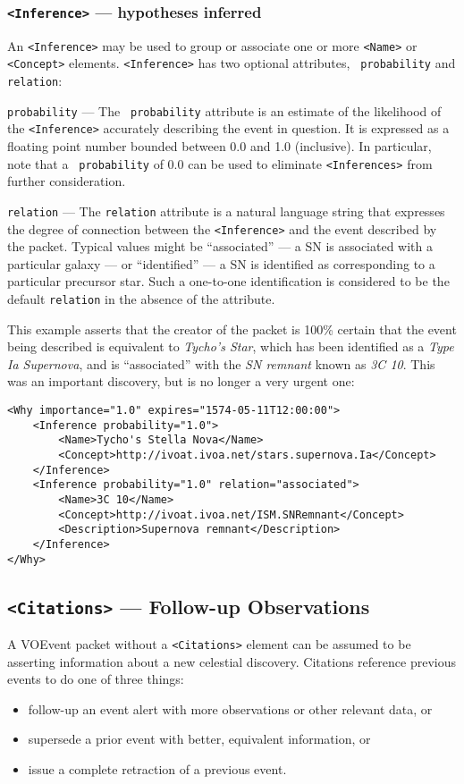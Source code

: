 \documentclass[11pt,a4paper]{ivoa}
\begin{document}
\subsubsection{{\tt <Inference>} --- hypotheses inferred}\label{sec:3.6.6}
An {\tt <Inference>} may be used to group or associate one or more {\tt <Name>}
or {\tt <Concept>} elements. {\tt <Inference>} has two optional attributes, {\tt
probability} and {\tt relation}:

 {\tt probability}\label{sec:3.6.6.1} --- The {\tt
probability} attribute is an estimate of the likelihood of the {\tt <Inference>}
accurately describing the event in question. It is expressed as a floating point
number bounded between 0.0 and 1.0 (inclusive). In particular, note that a {\tt
probability} of 0.0 can be used to eliminate {\tt <Inferences>} from further
consideration.

 {\tt relation}\label{sec:3.6.6.2} --- The {\tt relation}
attribute is a natural language string that expresses the degree of connection
between the {\tt <Inference>} and the event described by the packet. Typical
values might be ``associated'' --- a SN is associated with a particular galaxy
--- or ``identified'' --- a SN is identified as corresponding to a particular
precursor star. Such a one-to-one identification is considered to be the default
{\tt relation} in the absence of the attribute.

This example asserts that the creator of the packet is 100\% certain that the
event being described is equivalent to \emph{Tycho's Star}, which has been
identified as a \emph{Type Ia Supernova}, and is ``associated'' with the
\emph{SN remnant} known as \emph{3C 10}. This was an important discovery, but
is no longer a very urgent one:
\begin{lstlisting}
<Why importance="1.0" expires="1574-05-11T12:00:00">
    <Inference probability="1.0">
        <Name>Tycho's Stella Nova</Name>
        <Concept>http://ivoat.ivoa.net/stars.supernova.Ia</Concept>
    </Inference>
    <Inference probability="1.0" relation="associated">
        <Name>3C 10</Name>
        <Concept>http://ivoat.ivoa.net/ISM.SNRemnant</Concept>
        <Description>Supernova remnant</Description>
    </Inference>
</Why>
\end{lstlisting}

\subsection{{\tt <Citations>} --- Follow-up Observations}
\label{sec:3.7}
A VOEvent packet without a {\tt <Citations>} element can be assumed to be
asserting information about a new celestial discovery. Citations reference
previous events to do one of three things:
\begin{itemize}
\item follow-up an event alert with more observations or other relevant data, or
\item supersede a prior event with better, equivalent information, or
\item issue a complete retraction of a previous event.
\end{itemize}
\end{document}
